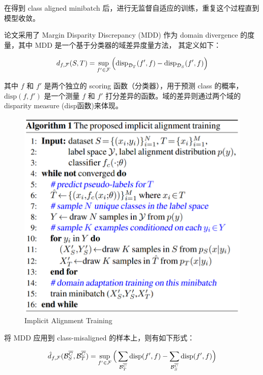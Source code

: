 \documentclass[UTF8]{ctexart}
\begin{document}
                在得到 class aligned minibatch 后，进行无监督自适应的训练，重复这个过程直到模型收敛。

                论文采用了 Margin Disparity Discrepancy (MDD) 作为 domain divergence 的度量，其中 MDD 是一个基于分类器的域差异度量方法，
                其定义如下：

                $$
                    d_{f,\mathcal F}( S, T)=\sup_{f'\in\mathcal F}\Big{(}\text{disp}_{\mathcal{D}_T}(f',f)-\text{disp}_{\mathcal{D}_S}(f',f)\Big{)}
                $$

                其中 $f$ 和 $f'$ 是两个独立的 scoring 函数（分类器），用于预测 class 的概率，
                $\text{disp}(f, f')$ 是一个测量 $f$ 和 $f'$ 打分差异的函数。域的差异则通过两个域的 disparity measure (disp函数)来体现。

                \begin{figure}[ht]
                    \centering
                    \includegraphics[scale=0.36]{Week07_train.png}
                    \caption{Implicit Alignment Training}
                    \label{fig:train}
                \end{figure}

                将 MDD 应用到 class-misaligned 的样本上，则有如下形式：

                $$
                    \hat{d}_{f,\mathcal F}( \mathcal{B}^{\overline{C}}_{S}, \mathcal{B}^{\overline{C}}_{T})=\sup_{f'\in\mathcal F}\Big{(}\sum_{\mathcal{B}^{\overline{C}}_{T}}\text{disp}(f',f)-\sum_{\mathcal{B}^{\overline{C}}_{S}}\text{disp}(f',f)\Big{)}
                $$
\end{document}
